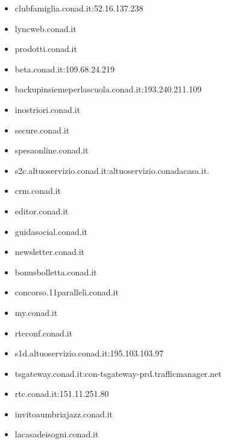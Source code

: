 \documentclass{article}
\begin{document}
\begin{itemize}
        \item clubfamiglia.conad.it:52.16.137.238
    
        \item lyncweb.conad.it
    
        \item prodotti.conad.it
    
        \item beta.conad.it:109.68.24.219
    
        \item backupinsiemeperlascuola.conad.it:193.240.211.109
    
        \item inostriori.conad.it
    
        \item secure.conad.it
    
        \item spesaonline.conad.it
    
        \item s2c.altuoservizio.conad.it:altuoservizio.conadacasa.it.
    
        \item crm.conad.it
    
        \item editor.conad.it
    
        \item guidasocial.conad.it
    
        \item newsletter.conad.it
    
        \item bonusbolletta.conad.it
    
        \item concorso.11paralleli.conad.it
    
        \item my.conad.it
    
        \item rtcconf.conad.it
    
        \item s1d.altuoservizio.conad.it:195.103.103.97
    
        \item tsgateway.conad.it:con-tsgateway-prd.trafficmanager.net
    
        \item rtc.conad.it:151.11.251.80
    
        \item invitoaumbriajazz.conad.it
    
        \item lacasadeisogni.conad.it
    
\end{itemize}
\end{document}
